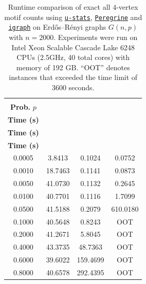 \documentclass[sn-mathphys, natbib=false]{sn-jnl}
\newcommand{\libref}[2]{\href{#2}{\texttt{#1}}}
\def\package{\libref{u-stats}{https://github.com/zrq1706/U-Statistics-Python}}
\def\igraph{\libref{igraph}{https://igraph.org/}}
\theoremstyle{plain}
\theoremstyle{definition}
\def\package{\libref{u-stats}{https://github.com/zrq1706/U-Statistics-Python}}
\def\igraph{\libref{igraph}{https://igraph.org/}}
\def\peregrine{\libref{Peregrine}{https://github.com/pdclab/peregrine}}
\begin{document}
\begin{bibunit}[agsm]
\begin{table}[h!]
\centering
\caption{
Runtime comparison of exact all $4$-vertex motif counts using \package{}, \peregrine{} and \igraph{} on Erd\H{o}s--R\'enyi graphs $G(n, p)$ with $n = 2000$. 
Experiments were run on Intel Xeon Scalable Cascade Lake 6248 CPUs (2.5GHz, 40 total cores) with memory of 192 GB.
``OOT'' denotes instances that exceeded the time limit of 3600 seconds.
}
\label{tab:motif_counts_4}
\begin{tabular}{cccc}
\toprule
\makecell{\textbf{Edge} \\ \textbf{Prob.} $p$} & \makecell{\textbf{\package{}} \\ \textbf{Time (s)}} & \makecell{\textbf{\peregrine{}} \\ \textbf{Time (s)}} & \makecell{\textbf{\igraph{}} \\ \textbf{Time (s)}} \\
\midrule
0.0005 & 3.8413 & 0.1024 & 0.0752 \\
0.0010 & 18.7463 & 0.1141 & 0.0873 \\
0.0050 & 41.0730 & 0.1132 & 0.2645 \\
0.0100 & 40.7701 & 0.1116 & 1.7099 \\
0.0500 & 41.5188 & 0.2079 & 610.0180 \\
0.1000 & 40.5648 & 0.8243 & OOT \\
0.2000 & 41.2671 & 5.8045 & OOT \\
0.4000 & 43.3735 & 48.7363 & OOT \\
0.6000 & 39.6022 & 159.4699 & OOT \\
0.8000 & 40.6578 & 292.4395 & OOT \\
\bottomrule
\end{tabular}
\end{table}


\end{bibunit}
\end{document}
